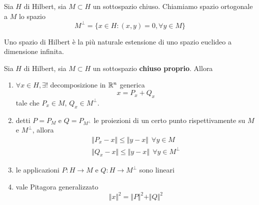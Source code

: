 \begin{figure}[htpb]
\end{figure}
\FloatBarrier

\begin{defn}
Sia $H$ di Hilbert, sia $M\subset H$ un sottospazio chiuso. Chiamiamo spazio ortogonale a $M$ lo spazio
\begin{equation*}
M^{\perp} = \{x\in H: (x, y) = 0, \forall y\in M\}
\end{equation*}
\end{defn}
Uno spazio di Hilbert è la più naturale estensione di uno spazio euclideo a dimensione infinita.
\begin{thm}
[di proiezione]
Sia $H$ di Hilbert, sia $M\subset H$ un sottospazio \textbf{chiuso proprio}. Allora
\begin{enumerate}
\item $\forall x\in H, \exists !$ decomposizione in $\mathbb{R}^{n}$ generica
\begin{equation*}
x = P_{x} + Q_{x}
\end{equation*}
tale che $P_{x} \in M$, $Q_{x} \in M^{\perp}$.
\item detti $P = P_{M}$ e $Q = P_{M^{\perp}}$ le proiezioni di un certo punto rispettivamente su $M$ e $M^{\perp}$, allora
\begin{gather*}
\Vert P_{x} - x \Vert \leq \Vert y - x \Vert \ \ \forall y\in M\\
\Vert Q_{x} - x \Vert \leq \Vert y - x \Vert \ \ \forall y\in M^{\perp}
\end{gather*}
\item le applicazioni $P: H\rightarrow M$ e $Q: H\rightarrow M^{\perp}$ sono lineari
\item vale Pitagora generalizzato
\begin{equation*}
\Vert x \Vert^{2} = \Vert P \Vert^{2} + \Vert Q \Vert^{2}
\end{equation*}
\end{enumerate}
\end{thm}

